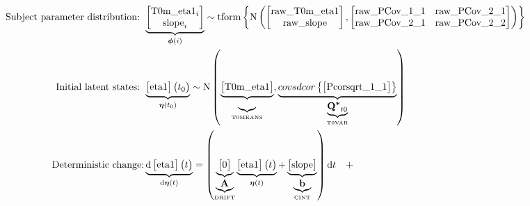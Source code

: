 \documentclass[a4paper]{article}
\newcommand{\vect}[1]{\boldsymbol{\mathbf{#1}}}
\begin{document}
 \begin{footnotesize}
 \setcounter{MaxMatrixCols}{200}
  \begin{align*}
  \textrm{Subject parameter distribution: }
             &\underbrace{\begin{bmatrix}
\text{T0m\_eta1}_i\\ 
\text{slope}_i
\end{bmatrix} 
            }_{\vect{\phi}(i)} \sim\textrm{tform}\left\{ \mathrm{N} \left(
              \begin{bmatrix}
\text{raw\_T0m\_eta1}\\ 
\text{raw\_slope}
\end{bmatrix}, \begin{bmatrix}
\text{raw\_PCov\_1\_1} & \text{raw\_PCov\_2\_1}\\ 
\text{raw\_PCov\_2\_1} & \text{raw\_PCov\_2\_2}
\end{bmatrix} \right) \right\} \\\textrm{Initial latent states: }
  &\underbrace{\begin{bmatrix}
\text{eta1}
\end{bmatrix} 
    \big{(}t_0\big{)}}_{\vect{\eta} (t_0)}	\sim \mathrm{N} \left(
              \underbrace{
        \begin{bmatrix}
\text{T0m\_eta1}
\end{bmatrix}
      }_{\underbrace{\vect{}}_\textrm{T0MEANS}},
      \underbrace{covsdcor \left\{
        \begin{bmatrix}
\text{Pcorsqrt\_1\_1}
\end{bmatrix}\right\}
      }_{\underbrace{\vect{Q^{*}}_{t0}}_\textrm{T0VAR}}
      \right) \\
      \textrm{Deterministic change:}
  &\underbrace{\mathrm{d}
    \begin{bmatrix}
\text{eta1}
\end{bmatrix} 
    \big{(}t\big{)}}_{\mathrm{d} \vect{\eta} (t)}	=  \left(
      \underbrace{
        \begin{bmatrix}
0
\end{bmatrix}
      }_{\underbrace{\vect{A}}_\textrm{DRIFT}} \underbrace{
        \begin{bmatrix}
\text{eta1}
\end{bmatrix} 
        \big{(}t\big{)}
      }_{\vect{\eta} (t)}	+ \underbrace{
        \begin{bmatrix}
\text{slope}
\end{bmatrix}
      }_{\underbrace{\vect{b}}_\textrm{CINT}}\right) \mathrm{d}t \quad + \nonumber \\ \\

\end{align*}
\end{footnotesize}
\end{document}
